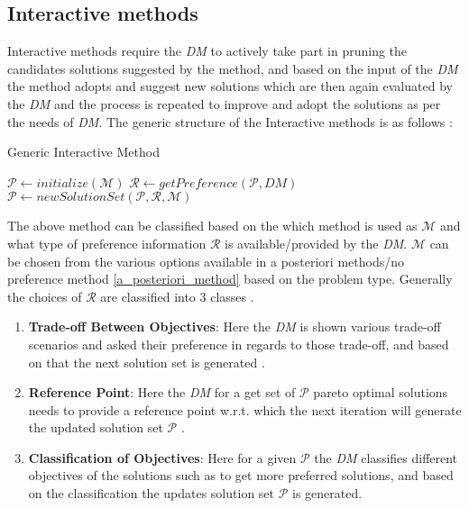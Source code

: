 \subsection{Interactive methods}
Interactive methods require the \textit{DM} to actively take part in pruning the candidates solutions suggested by the method, and based on the input of the \textit{DM} the method adopts and suggest new solutions which are then again evaluated by the \textit{DM} and the process is repeated to improve and adopt the solutions as per the needs of \textit{DM}.
\newline\newline The generic structure of the Interactive methods is as follows \cite{miettinen2008introduction}:
\begin{algorithm}
\caption{Generic Interactive Method}\label{algo_generic_interactive_method}
\begin{algorithmic}
\State $\mathcal{P} \gets initialize(\mathcal{M})$ 
\Do
    \State $\mathcal{R} \gets getPreference(\mathcal{P},DM)$
    \State $\mathcal{P} \gets newSolutionSet(\mathcal{P},\mathcal{R},\mathcal{M})$
\end{algorithmic}
\end{algorithm}
The above method can be classified based on the which method is used as $\mathcal{M}$ and what type of preference information $\mathcal{R}$ is available/provided by the \textit{DM}.
\newline \newline $\mathcal{M}$ can be chosen from the various options available in a posteriori methods/no preference method \ref{a_posteriori_method} based on the problem type.
\newline \newline Generally the choices of $\mathcal{R}$ are classified into 3 classes \cite{miettinen2008introduction}.
\begin{enumerate}
    \item \textbf{Trade-off Between Objectives}: Here the \textit{DM} is shown various trade-off scenarios and asked their preference in regards to those trade-off, and based on that the next solution set is generated \cite{zionts1976interactive}.
    \item \textbf{Reference Point}: Here the \textit{DM} for a get set of $\mathcal{P}$ pareto optimal solutions needs to provide a reference point w.r.t. which the next iteration will generate the updated solution set  $\mathcal{P}$ \cite{wierzbicki1986completeness}\cite{wierzbicki2000modern}.
    \item \textbf{Classification of Objectives}: Here for a given $\mathcal{P}$ the \textit{DM} classifies different objectives of the solutions such as to get more preferred solutions, and based on the classification the updates solution set $\mathcal{P}$ is generated.
\end{enumerate}
\newpage
